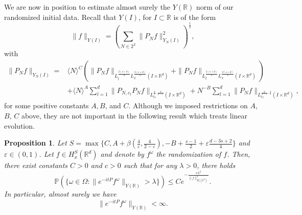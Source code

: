 \documentclass[aihp]{imsart}
\numberwithin{equation}{section}
\theoremstyle{plain}
\newtheorem{prop}[thm]{Proposition}
\theoremstyle{remark}
\newcommand{\R}{\mathbb{R}}
\newcommand{\Z}{\mathbb{Z}}
\begin{document}
We are now in position to estimate almost surely the $Y(\R)$ norm of our randomized initial data. Recall that $Y(I )$, for $I\subset \R$ is of the form
$$\|f\|_{Y(I)} = \left(\sum_{N\in 2^{\Z}}  \|P_N f\|_{Y_N(I)}^2\right)^{\frac{1}{2}},$$
with
\begin{align*}
\|P_N f\|_{Y_N(I)}=& \langle N\rangle^C \left(\|P_N f\|_{L_t^{\frac{2(s+d)}{d}} L_x^{\frac{2(s+d)}{s}} (I\times \R^d)} +\|P_N f\|_{L_t^{\frac{2(s+d)}{s}} L_x^{\frac{2(s+d)}{s}}(I\times \R^d) } \right)\\
&+\langle N\rangle^A \sum_{l=1}^d \|P_{N,e_l} P_N f \|_{L^{\frac{4}{\varepsilon},\frac{4}{2-\varepsilon}}_{e_l}(I\times \R^d) } +N^{-B} \sum_{l=1}^d \|P_N f\|_{L^{\frac{4}{2-\varepsilon},\frac{4}{\varepsilon}}_{e_l} (I\times \R^d) },  
\end{align*}
for some positive constants $A,B$, and $C$. Although we imposed restrictions on $A$, $B$, $C$ above, they are not important in the following result which treats linear evolution. 


\begin{prop}
\label{estY}
Let $S= \max\{C, A+\beta (\frac{4}{\varepsilon} , \frac{4}{2-\varepsilon}), -B+\frac{s-1}{2} + \varepsilon  \frac{d -3s+2}{4} \}$ and $\varepsilon \in (0, 1)$. Let $f\in H_x^S (\R^d)$ and denote by $f^\omega$ the randomization of $f$. Then, there exist constants $C>0$ and $c>0$ such that for any $\lambda >0$, there holds
$$\mathbb{P} \left(\{ \omega \in \Omega : \| e^{-it P} f^\omega \|_{Y(\R)} >\lambda \} \right) \leq C e^{-\frac{c \lambda^2}{ \|f\|_{H_x^s (\R^d )}^{2}} }.$$
In particular, almost surely we have
$$\| e^{-it P} f^\omega \|_{Y(\R)} <\infty. $$
\end{prop}
\end{document}
